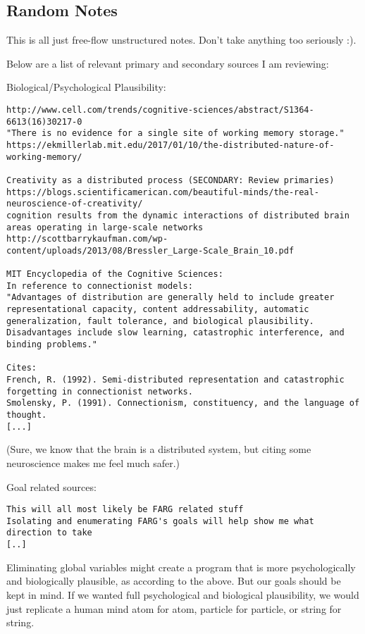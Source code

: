 \documentclass[a4paper]{article}
\begin{document}
\subsection{Random Notes}

This is all just free-flow unstructured notes. Don't take anything too seriously :).

Below are a list of relevant primary and secondary sources I am reviewing:

Biological/Psychological Plausibility:
\begin{verbatim}
http://www.cell.com/trends/cognitive-sciences/abstract/S1364-6613(16)30217-0
"There is no evidence for a single site of working memory storage."
https://ekmillerlab.mit.edu/2017/01/10/the-distributed-nature-of-working-memory/

Creativity as a distributed process (SECONDARY: Review primaries)
https://blogs.scientificamerican.com/beautiful-minds/the-real-neuroscience-of-creativity/
cognition results from the dynamic interactions of distributed brain areas operating in large-scale networks
http://scottbarrykaufman.com/wp-content/uploads/2013/08/Bressler_Large-Scale_Brain_10.pdf

MIT Encyclopedia of the Cognitive Sciences:
In reference to connectionist models:
"Advantages of distribution are generally held to include greater representational capacity, content addressability, automatic generalization, fault tolerance, and biological plausibility. Disadvantages include slow learning, catastrophic interference, and binding problems."

Cites:
French, R. (1992). Semi-distributed representation and catastrophic forgetting in connectionist networks.
Smolensky, P. (1991). Connectionism, constituency, and the language of thought.
[...]
\end{verbatim}

(Sure, we know that the brain is a distributed system, but citing some neuroscience makes me feel much safer.)

Goal related sources:
\begin{verbatim}
This will all most likely be FARG related stuff
Isolating and enumerating FARG's goals will help show me what direction to take
[..]
\end{verbatim}

Eliminating global variables might create a program that is more psychologically and biologically plausible, as according to the above. But our goals should be kept in mind. If we wanted full psychological and biological plausibility, we would just replicate a human mind atom for atom, particle for particle, or string for string. 
\end{document}
